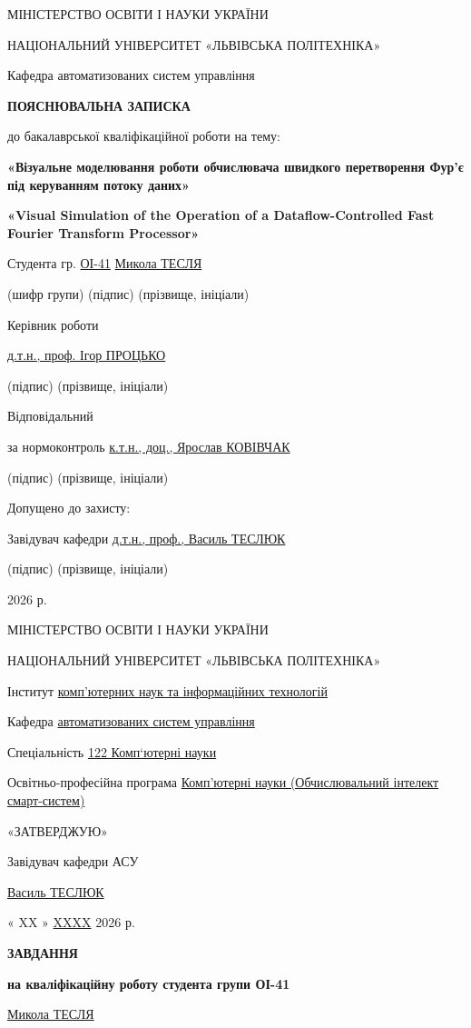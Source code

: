 \documentclass[
]{article}
\author{}
\date{}
\begin{document}
МІНІСТЕРСТВО ОСВІТИ І НАУКИ УКРАЇНИ

НАЦІОНАЛЬНИЙ УНІВЕРСИТЕТ «ЛЬВІВСЬКА ПОЛІТЕХНІКА»

Кафедра автоматизованих систем управління

\textbf{ПОЯСНЮВАЛЬНА ЗАПИСКА}

до бакалаврської кваліфікаційної роботи на тему:

\textbf{«Візуальне моделювання роботи обчислювача швидкого перетворення
Фур'є під керуванням потоку даних»}

\textbf{«Visual Simulation of the Operation of a Dataflow-Controlled
Fast Fourier Transform Processor»}

Студента гр. \ul{ОІ-41} \ul{Микола ТЕСЛЯ}

(шифр групи) (підпис) (прізвище, ініціали)

Керівник роботи

\ul{д.т.н., проф. Ігор ПРОЦЬКО}

(підпис) (прізвище, ініціали)

Відповідальний

за нормоконтроль \ul{к.т.н., доц., Ярослав КОВІВЧАК}

(підпис) (прізвище, ініціали)

Допущено до захисту:

Завідувач кафедри \ul{д.т.н., проф., Василь ТЕСЛЮК}

(підпис) (прізвище, ініціали)

2026 р.

МІНІСТЕРСТВО ОСВІТИ І НАУКИ УКРАЇНИ

НАЦІОНАЛЬНИЙ УНІВЕРСИТЕТ «ЛЬВІВСЬКА ПОЛІТЕХНІКА»

Інститут \ul{комп'ютерних наук та інформаційних технологій}

Кафедра \ul{автоматизованих систем управління}

Спеціальність \ul{122 Комп`ютерні науки}

Освітньо-професійна програма \ul{Комп'ютерні науки (Обчислювальний
інтелект смарт-систем)}

«ЗАТВЕРДЖУЮ»

Завідувач кафедри АСУ

\ul{Василь ТЕСЛЮК}

« XX » \ul{XXXX} 2026 р.

\textbf{ЗАВДАННЯ}

\textbf{на кваліфікаційну роботу студента групи ОІ-41}

\ul{Микола ТЕСЛЯ}
\end{document}
